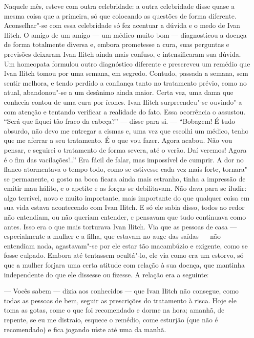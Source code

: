 Naquele mês, esteve com outra celebridade: a outra celebridade disse
quase a mesma coisa que a primeira, só que colocando as questões de
forma diferente. Aconselhar"-se com essa celebridade só fez acentuar a
dúvida e o medo de Ivan Ilitch. O amigo de um amigo --- um médico muito
bom --- diagnosticou a doença de forma totalmente diversa e, embora
prometesse a cura, suas perguntas e previsões deixaram Ivan Ilitch ainda
mais confuso, e intensificaram sua dúvida. Um homeopata formulou outro
diagnóstico diferente e prescreveu um remédio que Ivan Ilitch tomou por
uma semana, em segredo. Contudo, passada a semana, sem sentir melhora, e
tendo perdido a confiança tanto no tratamento prévio, como no atual,
abandonou"-se a um desânimo ainda maior. Certa vez, uma dama que conhecia
contou de uma cura por ícones. Ivan Ilitch surpreendeu"-se ouvindo"-a com
atenção e tentando verificar a realidade do fato. Essa ocorrência o
assustou. ``Será que fiquei tão fraco da cabeça?'' --- disse para si. ---
``Bobagem! É tudo absurdo, não devo me entregar a cismas e, uma vez que
escolhi um médico, tenho que me aferrar a seu tratamento. É o que vou
fazer. Agora acabou. Não vou pensar, e seguirei o tratamento de forma
severa, até o verão. Daí veremos! Agora é o fim das vacilações!..'' Era
fácil de falar, mas impossível de cumprir. A dor no flanco atormentava o
tempo todo, como se estivesse cada vez mais forte, tornara"-se
permanente, o gosto na boca ficara ainda mais estranho, tinha a
impressão de emitir mau hálito, e o apetite e as forças se debilitavam.
Não dava para se iludir: algo terrível, novo e muito importante, mais
importante do que qualquer coisa em sua vida estava acontecendo com Ivan
Ilitch. E só ele sabia disso, todos ao redor não entendiam, ou não
queriam entender, e pensavam que tudo continuava como antes. Isso era o
que mais torturava Ivan Ilitch. Via que as pessoas de casa ---
especialmente a mulher e a filha, que estavam no auge das saídas --- não
entendiam nada, agastavam"-se por ele estar tão macambúzio e exigente,
como se fosse culpado. Embora até tentassem ocultá"-lo, ele via como era
um estorvo, só que a mulher forjara uma certa atitude com relação à sua
doença, que mantinha independente do que ele dissesse ou fizesse. A
relação era a seguinte:

--- Vocês sabem --- dizia aos conhecidos --- que Ivan Ilitch não consegue,
como todas as pessoas de bem, seguir as prescrições do tratamento à
risca. Hoje ele toma as gotas, come o que foi recomendado e dorme na
hora; amanhã, de repente, se eu me distraio, esquece o remédio, come
esturjão (que não é recomendado) e fica jogando uíste até uma da manhã.

